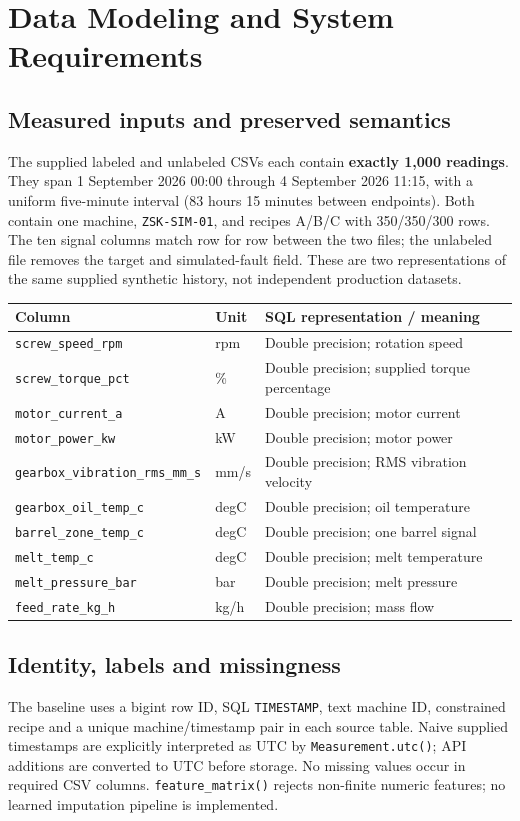 \chapter{Data Modeling and System Requirements}
\section{Measured inputs and preserved semantics}
The supplied labeled and unlabeled CSVs each contain \textbf{exactly 1,000 readings}. They span 1 September 2026 00:00 through 4 September 2026 11:15, with a uniform five-minute interval (83 hours 15 minutes between endpoints). Both contain one machine, \texttt{ZSK-SIM-01}, and recipes A/B/C with 350/350/300 rows. The ten signal columns match row for row between the two files; the unlabeled file removes the target and simulated-fault field. These are two representations of the same supplied synthetic history, not independent production datasets.
\par\smallskip\noindent\begin{tabularx}{\linewidth}{@{}l l X@{}}\toprule
Column & Unit & SQL representation / meaning\\\midrule
\texttt{screw\_speed\_rpm} & rpm & Double precision; rotation speed\\
\texttt{screw\_torque\_pct} & \% & Double precision; supplied torque percentage\\
\texttt{motor\_current\_a} & A & Double precision; motor current\\
\texttt{motor\_power\_kw} & kW & Double precision; motor power\\
\texttt{gearbox\_vibration\_rms\_mm\_s} & mm/s & Double precision; RMS vibration velocity\\
\texttt{gearbox\_oil\_temp\_c} & degC & Double precision; oil temperature\\
\texttt{barrel\_zone\_temp\_c} & degC & Double precision; one barrel signal\\
\texttt{melt\_temp\_c} & degC & Double precision; melt temperature\\
\texttt{melt\_pressure\_bar} & bar & Double precision; melt pressure\\
\texttt{feed\_rate\_kg\_h} & kg/h & Double precision; mass flow\\\bottomrule
\end{tabularx}\par\smallskip
\section{Identity, labels and missingness}
The baseline uses a bigint row ID, SQL \texttt{TIMESTAMP}, text machine ID, constrained recipe and a unique machine/timestamp pair in each source table. Naive supplied timestamps are explicitly interpreted as UTC by \texttt{Measurement.utc()}; API additions are converted to UTC before storage. No missing values occur in required CSV columns. \texttt{feature\_matrix()} rejects non-finite numeric features; no learned imputation pipeline is implemented.

